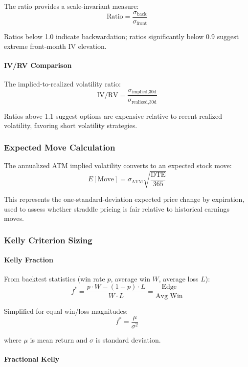 The ratio provides a scale-invariant measure:
\[
\text{Ratio} = \frac{\sigma_{\text{back}}}{\sigma_{\text{front}}}
\]

Ratios below 1.0 indicate backwardation; ratios significantly below 0.9 suggest extreme front-month IV elevation.

\paragraph{IV/RV Comparison}

The implied-to-realized volatility ratio:
\[
\text{IV/RV} = \frac{\sigma_{\text{implied,30d}}}{\sigma_{\text{realized,30d}}}
\]

Ratios above 1.1 suggest options are expensive relative to recent realized volatility, favoring short volatility strategies.

\subsubsection{Expected Move Calculation}

The annualized ATM implied volatility converts to an expected stock move:
\[
E[\text{Move}] = \sigma_{\text{ATM}} \sqrt{\frac{\text{DTE}}{365}}
\]

This represents the one-standard-deviation expected price change by expiration, used to assess whether straddle pricing is fair relative to historical earnings moves.

\subsubsection{Kelly Criterion Sizing}

\paragraph{Kelly Fraction}

From backtest statistics (win rate $p$, average win $W$, average loss $L$):
\[
f^* = \frac{p \cdot W - (1-p) \cdot L}{W \cdot L} = \frac{\text{Edge}}{\text{Avg Win}}
\]

Simplified for equal win/loss magnitudes:
\[
f^* = \frac{\mu}{\sigma^2}
\]

where $\mu$ is mean return and $\sigma$ is standard deviation.

\paragraph{Fractional Kelly}

